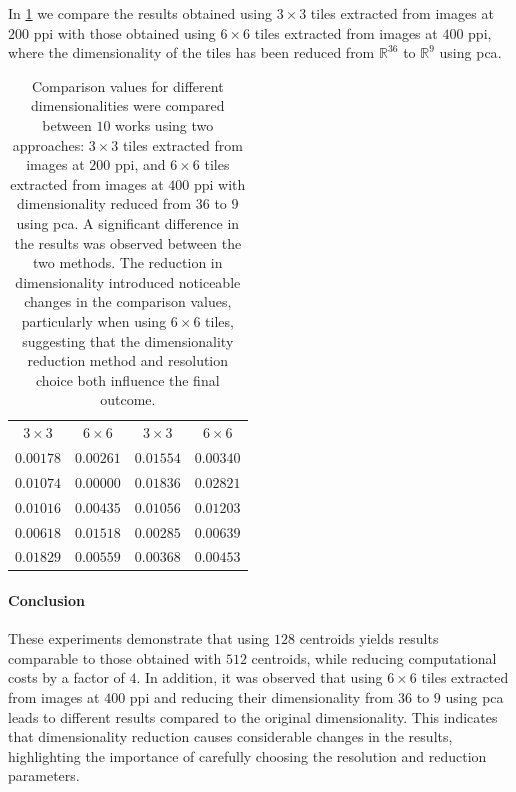 \begin{toReview}
	\noindent In \cref{tab:distDimensions} we compare the results obtained using $3\times3$ tiles extracted from images at $200$ \gls{ppi} with those obtained using $6\times6$ tiles extracted from images at $400$ \gls{ppi}, where the dimensionality of the tiles has been reduced from $\mathbb{R}^{36}$ to $\mathbb{R}^9$ using \gls{pca}.
	\newpage
	\begin{table}[H]
		\centering
		\begin{tabular}{|c|c||c|c|}
			\hline
			\rowcolor{ambra}
			\multicolumn{4}{|c|}{size of tiles} \\
			\hline
			\rowcolor {lavender} $3\times3$ & $6\times6$ & $3\times3$ & $6\times6$ \\
			\hline
			$0.00178$ & $0.00261$ & $0.01554$ & $0.00340$ \\
			\hline
			$0.01074$ & $0.00000$ & $0.01836$ & $0.02821$ \\
			\hline
			$0.01016$ & $0.00435$ & $0.01056$ & $0.01203$ \\
			\hline
			$0.00618$ & $0.01518$ & $0.00285$ & $0.00639$ \\
			\hline
			$0.01829$ & $0.00559$ & $0.00368$ & $0.00453$ \\
			\hline
		\end{tabular}
		\caption[Comparison values for different dimensions]{Comparison values for different dimensionalities were compared between $10$ works using two approaches: $3\times3$ tiles extracted from images at $200$ \gls{ppi}, and $6\times6$ tiles extracted from images at $400$ \gls{ppi} with dimensionality reduced from $36$ to $9$ using \gls{pca}. A significant difference in the results was observed between the two methods. The reduction in dimensionality introduced noticeable changes in the comparison values, particularly when using $6\times6$ tiles, suggesting that the dimensionality reduction method and resolution choice both influence the final outcome.}
		\label{tab:distDimensions}
	\end{table}

	\paragraph{Conclusion}
	These experiments demonstrate that using $128$ centroids yields results comparable to those obtained with $512$ centroids, while reducing computational costs by a factor of $4$. In addition, it was observed that using $6\times6$ tiles extracted from images at $400$ \gls{ppi} and reducing their dimensionality from $36$ to $9$ using \gls{pca} leads to different results compared to the original dimensionality. This indicates that dimensionality reduction causes considerable changes in the results, highlighting the importance of carefully choosing the resolution and reduction parameters.


\end{toReview}
